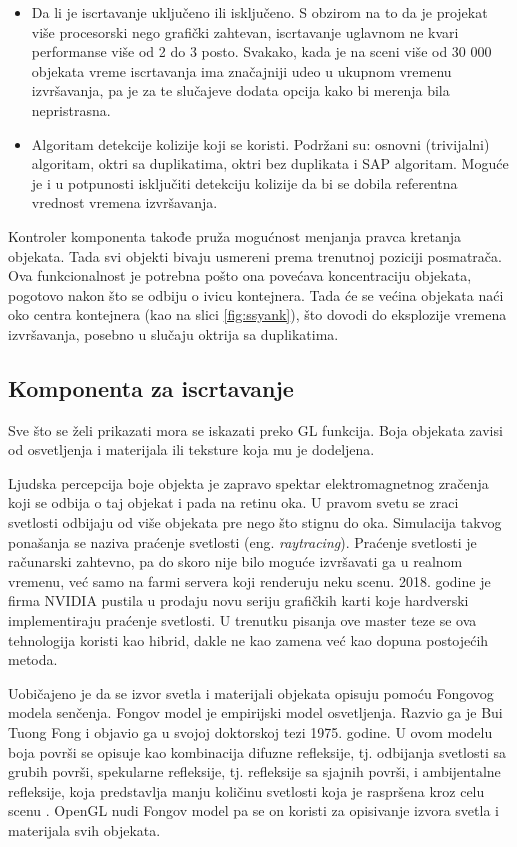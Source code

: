 \documentclass[12pt,oneside]{memoir}
\begin{document}
\begin{itemize}
	\item Da li je iscrtavanje uključeno ili isključeno. 
	S obzirom na to da je projekat više procesorski nego grafički zahtevan, iscrtavanje uglavnom ne kvari performanse više od 2 do 3 posto.
	Svakako, kada je na sceni više od 30 000 objekata vreme iscrtavanja ima značajniji udeo u ukupnom vremenu izvršavanja,
	pa je za te slučajeve dodata opcija kako bi merenja bila nepristrasna.
	\item Algoritam detekcije kolizije koji se koristi. Podržani su: osnovni (trivijalni) algoritam, oktri sa duplikatima,
	oktri bez duplikata i SAP algoritam. Moguće je i u potpunosti isključiti detekciju kolizije da bi se dobila referentna vrednost vremena izvršavanja.

\end{itemize}  

Kontroler komponenta takođe pruža mogućnost menjanja pravca kretanja objekata. 
Tada svi objekti bivaju usmereni prema trenutnoj poziciji posmatrača. 
Ova funkcionalnost je potrebna pošto ona povećava koncentraciju objekata, 
pogotovo nakon što se odbiju o ivicu kontejnera. Tada će se većina objekata 
naći oko centra kontejnera (kao na slici \ref{fig:ssyank}), što dovodi do eksplozije vremena izvršavanja, posebno u slučaju oktrija sa duplikatima.

\subsection{Komponenta za iscrtavanje}

Sve što se želi prikazati mora se iskazati preko GL funkcija. 
Boja objekata zavisi od osvetljenja i materijala ili teksture koja mu je dodeljena.

Ljudska percepcija boje objekta je zapravo spektar elektromagnetnog zračenja koji se odbija o taj objekat i pada na retinu oka.
U pravom svetu se zraci svetlosti odbijaju od više objekata pre nego što stignu do oka. 
Simulacija takvog ponašanja se naziva praćenje svetlosti (eng. {\em raytracing}).  
Praćenje svetlosti je računarski zahtevno, pa do skoro nije bilo moguće izvršavati ga u realnom vremenu, već samo na farmi servera koji renderuju neku scenu.
2018. godine je firma NVIDIA pustila u prodaju novu seriju grafičkih karti koje hardverski implementiraju praćenje svetlosti. 
U trenutku pisanja ove master teze se ova tehnologija koristi kao hibrid, dakle ne kao zamena već kao dopuna postojećih metoda.

Uobičajeno je da se izvor svetla i materijali objekata opisuju pomoću Fongovog modela senčenja. 
Fongov model je empirijski model osvetljenja. Razvio ga je Bui Tuong Fong i objavio ga u svojoj doktorskoj tezi 1975. godine.
U ovom modelu boja površi se opisuje kao kombinacija difuzne refleksije, tj. odbijanja svetlosti sa grubih površi, 
spekularne refleksije, tj. refleksije sa sjajnih površi, i ambijentalne refleksije, koja predstavlja manju količinu svetlosti 
koja je raspršena kroz celu scenu \cite{Phong}.
OpenGL nudi Fongov model pa se on koristi za opisivanje izvora svetla i materijala svih objekata.
\end{document}
